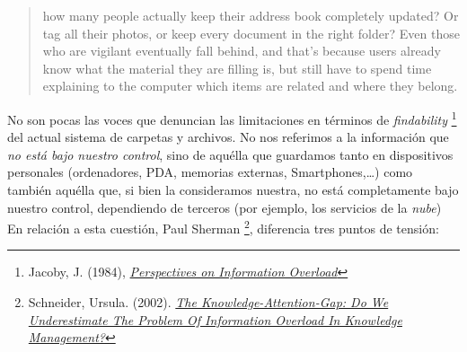 \documentclass[12pt, a4paper,twoside]{book}
\begin{document}
\begin{quote}
how many people actually keep their address book completely
updated? Or tag all their photos, or keep every document in the
right folder? Even those who are vigilant eventually fall behind,
and that's because users already know what the material they are
filling is, but still have to spend time explaining to the computer
which items are related and where they belong.

\end{quote}
No son pocas las voces que denuncian las limitaciones en términos
de \emph{findability}%
\footnote{Jacoby, J. (1984),
\emph{\href{http://www.jstor.org/pss/2488912}{Perspectives on Information Overload}}}
del actual sistema de carpetas y archivos. No nos referimos a la
información que \emph{no está bajo nuestro control}, sino de
aquélla que guardamos tanto en dispositivos personales
(ordenadores, PDA, memorias externas, Smartphones,\ldots{}) como
también aquélla que, si bien la consideramos nuestra, no está
completamente bajo nuestro control, dependiendo de terceros (por
ejemplo, los servicios de la \emph{nube}) En relación a esta
cuestión, Paul Sherman%
\footnote{Schneider, Ursula. (2002).
\emph{\href{http://www.jucs.org/jucs_8_5/the_knowledge_attention_gap/Schneider_U.html}{The Knowledge-Attention-Gap: Do We Underestimate The Problem Of Information Overload In Knowledge Management?}}},
diferencia tres puntos de tensión:
\end{document}

